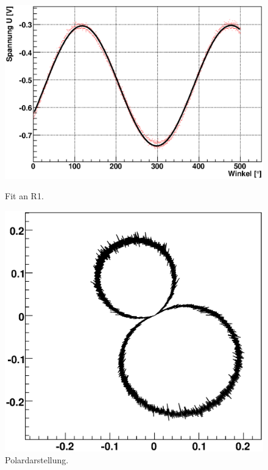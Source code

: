 \documentclass[12pt]{article}
\begin{document}
\begin{figure}[H]  
\begin{minipage}{0.5\linewidth}
\centering
\includegraphics[width=0.9\linewidth]{pictures/R1.eps}
\caption{Fit an R1.}
\end{minipage}
\begin{minipage}{0.5\linewidth}
\centering 
\includegraphics[width=0.9\linewidth]{pictures/R1vd.eps}
\caption{Polardarstellung.}
\end{minipage}
\end{figure}
\end{document}
